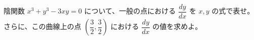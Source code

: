 
陰関数 $x^{3} + y^{3} - 3xy = 0$ について、一般の点における $\dfrac{dy}{dx}$ を $x,y$ の式で表せ。さらに、この曲線上の点 $\left(\dfrac{3}{2}, \dfrac{3}{2}\right)$ における $\dfrac{dy}{dx}$ の値を求めよ。
